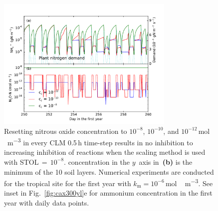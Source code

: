 \documentclass[gmd,noline]{copernicus}
\begin{document}
\begin{figure}[p]
\includegraphics[width=85mm]{gmd-2015-254-f07.pdf}
\caption{Resetting nitrous oxide concentration to $10^{-8}$, $10^{-10}$, and
$10^{-12}$\,\unit{mol\,m^{-3}} in every CLM 0.5\,h time-step results in no
inhibition to increasing inhibition of reactions when the scaling method is
used with STOL\,$=$\,$10^{-8}$.  concentration in the $y$~axis
in~\textbf{(b)} is the minimum of the 10 soil layers. Numerical experiments
are conducted for the tropical site for the first year with
$k_\mathrm{m}=10^{-6}$\,\unit{mol\,m^{-3}}. See inset in
Fig.~\ref{fig:cax300yl}e for ammonium concentration in the first year with
daily data points.} \label{fig:cax1yn2o}
\end{figure}
\end{document}
